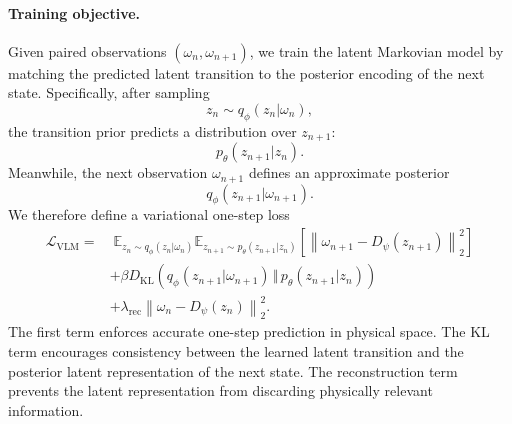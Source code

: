\documentclass[11pt]{article}
\begin{document}
\paragraph{Training objective.}
Given paired observations $(\omega_n,\omega_{n+1})$, we train the latent Markovian model by matching the predicted latent transition to the posterior encoding of the next state. Specifically, after sampling
\begin{equation}
    z_n \sim q_\phi(z_n|\omega_n),
\end{equation}
the transition prior predicts a distribution over $z_{n+1}$:
\begin{equation}
    p_\theta(z_{n+1}|z_n).
\end{equation}
Meanwhile, the next observation $\omega_{n+1}$ defines an approximate posterior
\begin{equation}
    q_\phi(z_{n+1}|\omega_{n+1}).
\end{equation}
We therefore define a variational one-step loss
\begin{equation}
\begin{aligned}
    \mathcal L_{\mathrm{VLM}}
    =
    &\;
    \mathbb E_{z_n\sim q_\phi(z_n|\omega_n)}
    \mathbb E_{z_{n+1}\sim p_\theta(z_{n+1}|z_n)}
    \left[
        \left\|
            \omega_{n+1}
            -
            D_\psi(z_{n+1})
        \right\|_2^2
    \right]
    \\
    &+
    \beta
    D_{\mathrm{KL}}
    \left(
        q_\phi(z_{n+1}|\omega_{n+1})
        \,\Vert\,
        p_\theta(z_{n+1}|z_n)
    \right)
    \\
    &+
    \lambda_{\mathrm{rec}}
    \left\|
        \omega_n
        -
        D_\psi(z_n)
    \right\|_2^2 .
\end{aligned}
\end{equation}
The first term enforces accurate one-step prediction in physical space. The KL term encourages consistency between the learned latent transition and the posterior latent representation of the next state. The reconstruction term prevents the latent representation from discarding physically relevant information.
\end{document}
